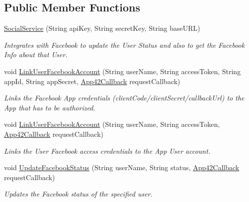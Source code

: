 \subsection*{Public Member Functions}
\begin{DoxyCompactItemize}
\item 
\hyperlink{classcom_1_1shephertz_1_1app42_1_1paas_1_1sdk_1_1windows_1_1social_1_1_social_service_a52d49daaf715d774bf5779b34a0d6c09}{Social\+Service} (String api\+Key, String secret\+Key, String base\+U\+R\+L)
\begin{DoxyCompactList}\small\item\em Integrates with Facebook to update the User Status and also to get the Facebook Info about that User. \end{DoxyCompactList}\item 
void \hyperlink{classcom_1_1shephertz_1_1app42_1_1paas_1_1sdk_1_1windows_1_1social_1_1_social_service_a6f2dbc306f1b7fc06cc150bad61db46e}{Link\+User\+Facebook\+Account} (String user\+Name, String access\+Token, String app\+Id, String app\+Secret, \hyperlink{interfacecom_1_1shephertz_1_1app42_1_1paas_1_1sdk_1_1windows_1_1_app42_callback}{App42\+Callback} request\+Callback)
\begin{DoxyCompactList}\small\item\em Links the Facebook App credentials (client\+Code/client\+Secret/callback\+Url) to the App that has to be authorized. \end{DoxyCompactList}\item 
void \hyperlink{classcom_1_1shephertz_1_1app42_1_1paas_1_1sdk_1_1windows_1_1social_1_1_social_service_a0a2372b4ff5faa805c48a07602520b41}{Link\+User\+Facebook\+Account} (String user\+Name, String access\+Token, \hyperlink{interfacecom_1_1shephertz_1_1app42_1_1paas_1_1sdk_1_1windows_1_1_app42_callback}{App42\+Callback} request\+Callback)
\begin{DoxyCompactList}\small\item\em Links the User Facebook access credentials to the App User account. \end{DoxyCompactList}\item 
void \hyperlink{classcom_1_1shephertz_1_1app42_1_1paas_1_1sdk_1_1windows_1_1social_1_1_social_service_a12bf3df3414f57956a4d6f058b338d45}{Update\+Facebook\+Status} (String user\+Name, String status, \hyperlink{interfacecom_1_1shephertz_1_1app42_1_1paas_1_1sdk_1_1windows_1_1_app42_callback}{App42\+Callback} request\+Callback)
\begin{DoxyCompactList}\small\item\em Updates the Facebook status of the specified user. \end{DoxyCompactList}\item 

\end{DoxyCompactItemize}
